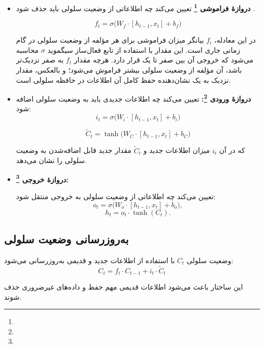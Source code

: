 \begin{itemize}
	\item \textbf{دروازهٔ فراموشی \footnote{}}
	تعیین می‌کند چه اطلاعاتی از وضعیت سلولی باید حذف شود
	\cite{gers1999learning}.
	
	\begin{equation}
		f_t = \sigma \big( W_f \cdot [h_{t-1}, x_t] + b_f \big)
	\end{equation}

در این معادله، \( f_t \) بیانگر میزان فراموشی برای هر مؤلفه از وضعیت سلولی در گام زمانی جاری است. این مقدار با استفاده از تابع فعال‌ساز سیگموید \( \sigma \) محاسبه می‌شود که خروجی آن بین صفر تا یک قرار دارد. هرچه مقدار \( f_t \) به صفر نزدیک‌تر باشد، آن مؤلفه از وضعیت سلولی بیشتر فراموش می‌شود؛ و بالعکس، مقدار نزدیک به یک نشان‌دهنده حفظ کامل آن اطلاعات در حافظه سلولی است.



	\item \textbf{دروازهٔ ورودی \footnote{}:}
	تعیین می‌کند چه اطلاعات جدیدی باید به وضعیت سلولی اضافه شود:
	\begin{equation}
		i_t = \sigma \big( W_i \cdot [h_{t-1}, x_t] + b_i \big)
	\end{equation}
	
	\begin{equation}
		\tilde{C}_t = \tanh \big( W_C \cdot [h_{t-1}, x_t] + b_C \big)
	\end{equation}

	که در آن \( i_t \) میزان اطلاعات جدید و \( \tilde{C}_t \) مقدار جدید قابل اضافه‌شدن به وضعیت سلولی را نشان می‌دهد.
	
\item \textbf{دروازهٔ خروجی \footnote{}:}

	تعیین می‌کند چه اطلاعاتی از وضعیت سلولی به خروجی منتقل شود:
	\[
	o_t = \sigma \big( W_o \cdot [h_{t-1}, x_t] + b_o \big),
	\]
	\[
	h_t = o_t \cdot \tanh(C_t).
	\]
\end{itemize}

\subsection{به‌روزرسانی وضعیت سلولی}
وضعیت سلولی \( C_t \) با استفاده از اطلاعات جدید و قدیمی به‌روزرسانی می‌شود:
	\begin{equation}
		C_t = f_t \cdot C_{t-1} + i_t \cdot \tilde{C}_t
	\end{equation}

این ساختار باعث می‌شود اطلاعات قدیمی مهم حفظ و داده‌های غیرضروری حذف شوند.

